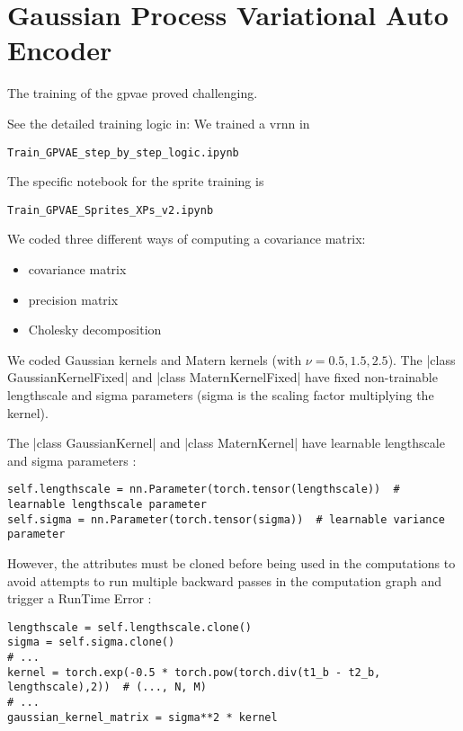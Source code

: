 \section{Gaussian Process Variational Auto Encoder}

The training of the \gls{gpvae} proved challenging.

See the detailed training logic in:
We trained a \gls{vrnn} in
\begin{verbatim}
Train_GPVAE_step_by_step_logic.ipynb
\end{verbatim}

The specific notebook for the sprite training is 
\begin{verbatim}
Train_GPVAE_Sprites_XPs_v2.ipynb
\end{verbatim}

We coded three different ways of computing a covariance matrix:
\begin{itemize}
    \item covariance matrix
    \item precision matrix
    \item Cholesky decomposition
\end{itemize}

We coded Gaussian kernels and Matern kernels (with $\nu = 0.5, 1.5, 2.5$).
The |class GaussianKernelFixed| and |class MaternKernelFixed| have fixed non-trainable lengthscale 
and sigma parameters (sigma is the scaling factor multiplying the kernel).

The |class GaussianKernel| and |class MaternKernel| have learnable lengthscale 
and sigma parameters : 
\begin{verbatim}
self.lengthscale = nn.Parameter(torch.tensor(lengthscale))  # learnable lengthscale parameter    
self.sigma = nn.Parameter(torch.tensor(sigma))  # learnable variance parameter
\end{verbatim}
However, the attributes must be cloned before being used in the computations to avoid attempts to run multiple backward passes in the 
computation graph and trigger a RunTime Error :
\begin{verbatim}
lengthscale = self.lengthscale.clone()
sigma = self.sigma.clone()
# ...
kernel = torch.exp(-0.5 * torch.pow(torch.div(t1_b - t2_b, lengthscale),2))  # (..., N, M)
# ...        
gaussian_kernel_matrix = sigma**2 * kernel
\end{verbatim}

